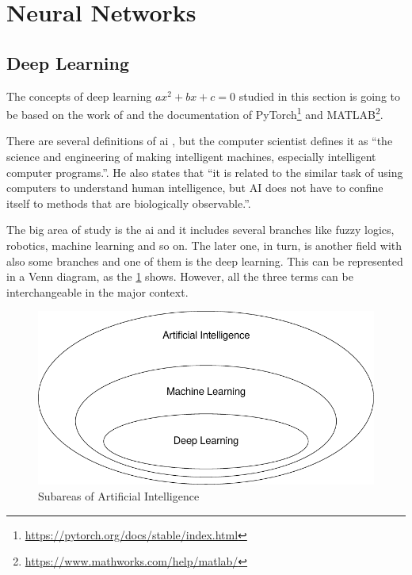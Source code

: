 \section{Neural Networks}

\subsection{Deep Learning}

The concepts of deep learning \(ax^2+bx+c = 0\) studied in this section is going to be based on the work of \citet{goodfellow2016} and the documentation of PyTorch\footnote{\url{https://pytorch.org/docs/stable/index.html}} and MATLAB\footnote{\url{https://www.mathworks.com/help/matlab/}}.

There are several definitions of \gls*{ai} \citep{winston1992}, but the  computer scientist \citet{mccarthy2007} defines it as ``the science and engineering of making intelligent machines, especially intelligent computer programs.''.
He also states that ``it is related to the similar task of using computers to understand human intelligence, but AI does not have to confine itself to methods that are biologically observable.''.

The big area of study is the \gls*{ai} and it includes several branches like fuzzy logics, robotics, machine learning and so on. 
The later one, in turn, is another field with also some branches and one of them is the deep learning.
This can be represented in a Venn diagram, as the \cref{fig:venn_dl} shows.
However, all the three terms can be interchangeable in the major context.

\begin{figure}[!htb]
    \centering
    \includegraphics{figures/2review/nn/venn_dl.pdf}
    \caption{Subareas of Artificial Intelligence}
    \label{fig:venn_dl}
\end{figure}

